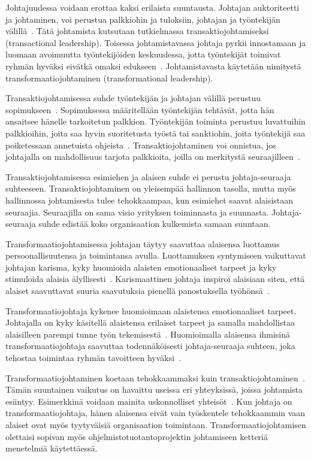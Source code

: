 \documentclass[finnish]{tktltiki2}
\theoremstyle{definition}
\theoremstyle{remark}
\begin{document}
Johtajuudessa voidaan erottaa kaksi erilaista suuntausta. Johtajan auktoriteetti ja johtaminen, voi perustua palkkiohin ja tuloksiin, johtajan ja työntekijän välillä~\cite{bass1990transactional}. Tätä johtamista kutsutaan tutkielmassa transaktiojohtamiseksi (transactional leadership). Toisessa johtamistavassa johtaja pyrkii innostamaan ja luomaan avoimuutta työntekijöiden keskuudessa, jotta työntekijät toimivat ryhmän hyväksi eivätkä omaksi edukseen~\cite{bass1990transactional}. Johtamistavasta käytetään nimitystä  transformaatiojohtaminen (transformational leadership).

Transaktiojohtamisessa suhde työntekijän ja johtajan välillä perustuu sopimukseen~\cite{bass1990transactional}. Sopimuksessa määritellään työntekijän tehtävät, jotta hän ansaitsee hänelle tarkoitetun palkkion. Työntekijän toiminta perustuu luvattuihin palkkioihin, joita saa hyvin suoritetusta työstä tai sanktiohin, joita työntekijä saa poiketessaan annetuista ohjeista~\cite{bass1990transactional}. Transaktiojohtaminen voi onnistua, jos johtajalla on mahdollisuus tarjota palkkioita, joilla on merkitystä seuraajilleen~\cite{bass1990transactional}.

Transaktiojohtamisessa esimiehen ja alaisen suhde ei perustu johtaja-seuraaja suhteeseen. Transaktiojohtaminen on yleisempää hallinnon tasolla, mutta myös hallinnossa johtamisesta tulee tehokkaampaa, kun esimiehet saavat alaisistaan seuraajia. Seuraajilla on sama visio yrityksen toiminnasta ja suunnasta. Johtaja-seuraaja suhde edistää koko organisaation kulkemista samaan suuntaan.

Transformaatiojohtamisessa johtajan täytyy saavuttaa alaisensa luottamus persoonallisuutensa ja toimintansa avulla. Luottamuksen syntymiseen vaikuttavat johtajan karisma, kyky huomioida alaisten emotionaaliset tarpeet ja kyky stimuloida alaisia älyllisesti~\cite{bass1990transactional}. Karismaattinen johtaja inspiroi alaisiaan siten, että alaiset saavuttavat suuria saavutuksia pienellä panostuksella työhönsä~\cite{bass1990transactional}.

Transformaatiojohtaja kykenee huomioimaan alaistensa emotionaaliset tarpeet. Johtajalla on kyky käsitellä alaistensa erilaiset tarpeet ja samalla mahdollistaa alaisilleen parempi tunne työn tekemisestä~\cite{palmer2001emotional}. Huomioimalla alaisensa ihmisinä transformaatiojohtaja saavuttaa todennäköisesti johtaja-seuraaja suhteen, joka tehostaa toimintaa ryhmän tavoitteen hyväksi~\cite{raccoon2006leadership}.

Transformaatiojohtaminen koetaan tehokkaammaksi kuin transaktiojohtaminen~\cite{palmer2001emotional}. Tämän suuntainen vaikutus on havaittu useissa eri yhteyksissä, joissa johtamista esiintyy. Esimerkkinä voidaan mainita uskonnolliset yhteisöt~\cite{bass1990transactional}. Kun johtaja on transformaatiojohtaja, hänen alaisensa eivät vain työskentele tehokkaammin vaan alaiset ovat myös tyytyväisiä organisaation toimintaan. Transformaatiojohtamisen olettaisi sopivan myös ohjelmistotuotantoprojektin johtamiseen ketteriä menetelmiä käytettäessä.
\end{document}
